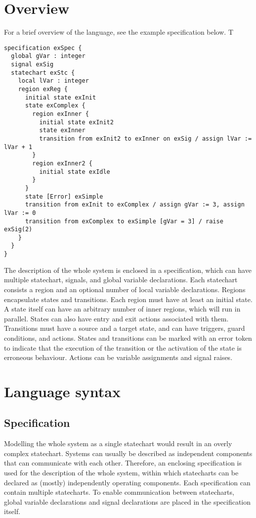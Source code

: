 \section{Overview}
For a brief overview of the language, see the example specification below. T
\begin{verbatim}
specification exSpec {
  global gVar : integer
  signal exSig
  statechart exStc {
    local lVar : integer
    region exReg {
      initial state exInit
      state exComplex {
        region exInner {
          initial state exInit2
          state exInner
          transition from exInit2 to exInner on exSig / assign lVar := lVar + 1
        }
        region exInner2 {
          initial state exIdle
        }
      }
      state [Error] exSimple
      transition from exInit to exComplex / assign gVar := 3, assign lVar := 0
      transition from exComplex to exSimple [gVar = 3] / raise exSig(2)
    }
  }
}
\end{verbatim}
The description of the whole system is enclosed in a specification, which can have multiple statechart, signals, and global variable declarations. Each statechart consists a region and an optional number of local variable declarations. Regions encapsulate states and transitions. Each region must have at least an initial state. A state itself can have an arbitrary number of inner regions, which will run in parallel. States can also have entry and exit actions associated with them. Transitions must have a source and a target state, and can have triggers, guard conditions, and actions. States and transitions can be marked with an error token to indicate that the execution of the transition or the activation of the state is erroneous behaviour. Actions can be variable assignments and signal raises.
\section{Language syntax}
  \subsection{Specification}
Modelling the whole system as a single statechart would result in an overly complex statechart. Systems can usually be described as independent components that can communicate with each other. Therefore, an enclosing specification is used for the description of the whole system, within which statecharts can be declared as (mostly) independently operating components. Each specification can contain multiple statecharts. To enable communication between statecharts, global variable declarations and signal declarations are placed in the specification itself.

